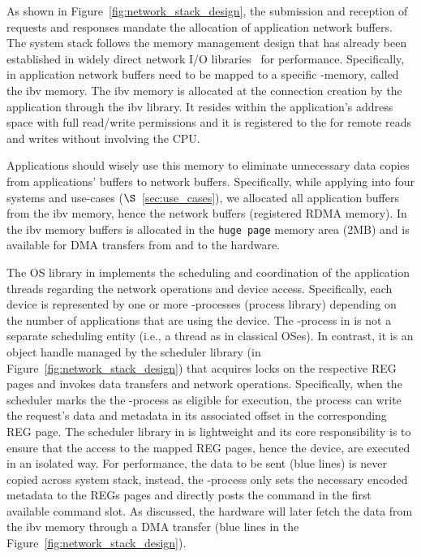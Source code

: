 As shown in Figure~\ref{fig:network_stack_design}, the submission and reception of
requests and responses mandate the allocation of application network
buffers. The \projecttitle{} system stack follows the memory management design that has already been established in widely direct network I/O libraries~\cite{erpc, dpdk, rdma} for performance. Specifically, in \projecttitle{} application network buffers need to be mapped to a specific \projecttitle{}-memory, called the ibv memory. The ibv memory is allocated at the connection creation by the application through the ibv library. It resides within the application's address space with full read/write permissions and it is registered to the \projecttitle{} for remote reads and writes without involving the CPU.

Applications should wisely use this memory to eliminate unnecessary data copies from  applications' buffers to network buffers. Specifically, while applying \projecttitle{} into four systems and use-cases ($\S$~\ref{sec:use_cases}), we allocated all application buffers from the ibv memory, hence the network buffers (registered RDMA memory). In \projecttitle{} the ibv memory buffers is allocated in the {\tt huge page} memory area (2MB) and is available for DMA transfers from and to the \projecttitle{} hardware.  



 The OS library in \projecttitle{} implements the scheduling and coordination of the application threads regarding the network operations and \projecttitle{} device access. Specifically, each \projecttitle{} device is represented by one or more \projecttitle{}-processes (process library) depending on the number of applications that are using the device. The \projecttitle{}-process in \projecttitle{} is not a separate  scheduling entity (i.e., a thread as in classical OSes). In contrast, it is an object handle managed by the scheduler library (in Figure~\ref{fig:network_stack_design}) that acquires locks on the respective REG pages and invokes data transfers and network operations. Specifically, when the scheduler marks the the \projecttitle{}-process as eligible for execution, the process can write the request's data and metadata in its associated offset in the corresponding REG page. The scheduler library in \projecttitle{} is lightweight and its core responsibility is to ensure that the access to the mapped REG pages, hence the device, are executed in an isolated way. For performance, the data to be sent (blue lines) is never copied across \projecttitle{} system stack, instead, the \projecttitle{}-process only sets the necessary encoded metadata to the REGs pages and directly posts the command in the first available command slot. As discussed, the \projecttitle{} hardware will later fetch the data from the ibv memory through a DMA transfer (blue lines in the Figure~\ref{fig:network_stack_design}).

